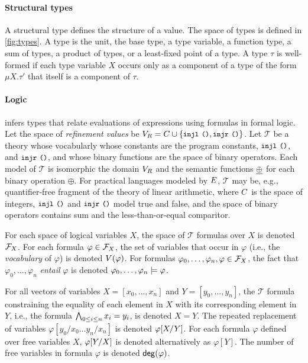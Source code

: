 \paragraph{Structural types}
%
A structural type defines the structure of a value.
%
The space of types is defined in \autoref{fig:types}.
%
A type is the unit, the base type, a type variable, a function type, a
sum of types, a product of types, or a least-fixed point of a type.
%
A type $\tau$ is well-formed if each type variable $X$ occurs only as
a component of a type of the form $\mu X. \tau'$ that itself is a
component of $\tau$.

\paragraph{Logic}
\sys infers types that relate evaluations of expressions using
formulas in formal logic.
%
Let the space of \emph{refinement values} be
$\fovals = \consts \union \elts{ \injl\ \unit, \injr\ \unit }$.
%
Let $\mathcal{T}$ be a theory whose vocabularly whose constants are
the program constants, $\injl\ \unit$, and $\injr\ \unit$, and whose
binary functions are the space of binary operators.
%
Each model of $\mathcal{T}$ is isomorphic the domain $\fovals$ and the
semantic functions $\interp{\oplus}$ for each binary operation
$\oplus$.
%
For practical languages modeled by $\expr$, $\mathcal{T}$ may be,
e.g., quantifier-free fragment of the theory of linear arithmetic,
where $\consts$ is the space of integers, $\injl\ \unit$ and
$\injr\ \unit$ model true and false, and the space of binary operators
contains sum and the less-than-or-equal comparitor.

For each space of logical variables $X$, the space of $\mathcal{T}$
formulas over $X$ is denoted $\formulas{ X }$.
%
For each formula $\varphi \in \formulas{X}$, the set of variables that
occur in $\varphi$ (i.e., the \emph{vocabulary} of $\varphi$) is
denoted $\vocab(\varphi)$.
For formulas $\varphi_0, \ldots, \varphi_n, \varphi \in \formulas{X}$,
the fact that $\varphi_0, \ldots, \varphi_n$ \emph{entail} $\varphi$
is denoted $\varphi_0, \ldots, \varphi_n \entails \varphi$.

For all vectors of variables $X = [ x_0, \ldots, x_n ]$ and
$Y = [ y_0, \ldots, y_n ]$, the $\mathcal{T}$ formula constraining the
equality of each element in $X$ with its corresponding element in $Y$,
i.e., the formula $\bigland_{0 \leq i \leq n} x_i = y_i$, is denoted
$X = Y$.
%
The repeated replacement of variables $\varphi[ y_0 / x_0 \ldots y_{n}
/ x_{n} ]$ is denoted $\replace{\varphi}{Y}{X}$.
%
For each formula $\varphi$ defined over free variables $X$,
$\replace{\varphi}{X}{Y}$ is denoted alternatively as $\varphi[Y]$.
%
The number of free variables in formula $\varphi$ is denoted
$\degreeof(\varphi)$.

